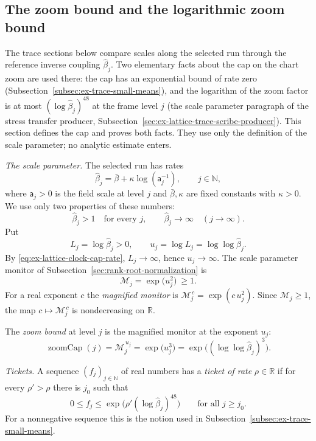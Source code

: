 \subsection{The zoom bound and the logarithmic zoom bound}
\label{sec:ex-lattice-trace-clock-cap}

The trace sections below compare scales along the selected run through the
reference inverse coupling $\widehat\beta_j$. Two elementary facts about the cap on the
chart zoom are used there: the cap has an exponential bound of rate zero
(Subsection~\ref{subsec:ex-trace-small-means}), and the logarithm of the
zoom factor is at most $(\log\widehat\beta_j)^{48}$ at the frame level
$j$ (the scale parameter paragraph of the stress transfer producer,
Subsection~\ref{sec:ex-lattice-trace-scribe-producer}). This section defines
the cap and proves both facts. They use only the definition of the scale parameter;
no analytic estimate enters.

\emph{The scale parameter.} The selected run has rates
\[
 \widehat\beta_j=\bar\beta+\kappa\log(\mathsf a_j^{-1}),
 \qquad j\in\mathbb N,
\]
where $\mathsf a_j>0$ is the field scale at level $j$ and $\bar\beta,\kappa$
are fixed constants with $\kappa>0$. We use only two properties of these
numbers:
\begin{equation}
 \widehat\beta_j>1\quad\text{for every }j,
 \qquad
 \widehat\beta_j\longrightarrow\infty\quad(j\to\infty).
 \label{eq:ex-lattice-clock-cap-rate}
\end{equation}
Put
\[
 L_j=\log\widehat\beta_j>0,
 \qquad
 u_j=\log L_j=\log\log\widehat\beta_j .
\]
By \eqref{eq:ex-lattice-clock-cap-rate}, $L_j\to\infty$, hence
$u_j\to\infty$. The scale parameter monitor of
Subsection~\ref{sec:rank-root-normalization} is
\[
 \mathcal M_j=\exp\bigl(u_j^2\bigr)\ \geq1 .
\]
For a real exponent $c$ the \emph{magnified monitor} is
$\mathcal M_j^{\,c}=\exp(c\,u_j^2)$. Since $\mathcal M_j\geq1$, the map
$c\mapsto\mathcal M_j^{\,c}$ is nondecreasing on $\mathbb R$.

\begin{definition}
\label{def:ex-lattice-tiltcap}
The \emph{zoom bound} at level $j$ is the magnified monitor at the exponent
$u_j$:
\[
 \operatorname{zoomCap}(j)=\mathcal M_j^{\,u_j}
 =\exp\bigl(u_j^3\bigr)
 =\exp\bigl((\log\log\widehat\beta_j)^3\bigr).
\]
\end{definition}

\emph{Tickets.} A sequence $(f_j)_{j\in\mathbb N}$ of real numbers has a
\emph{ticket of rate} $\rho\in\mathbb R$ if for every $\rho'>\rho$ there
is $j_0$ such that
\[
 0\leq f_j\leq\exp\bigl(\rho'(\log\widehat\beta_j)^{48}\bigr)
 \qquad\text{for all }j\geq j_0 .
\]
For a nonnegative sequence this is the notion used in
Subsection~\ref{subsec:ex-trace-small-means}.

